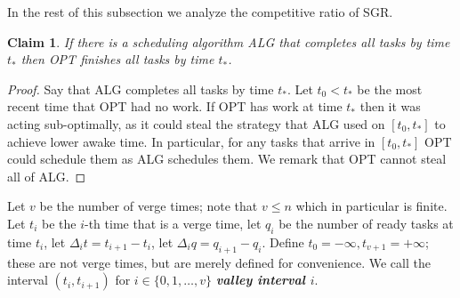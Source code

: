 \documentclass[twocolumn]{article}[10pt]
\newcommand{\defn}[1]{{\textit{\textbf{\boldmath #1}}}\xspace}
\newcommand{\floor}[1]{\left\lfloor #1 \right\rfloor}
\newtheorem{clm}{Claim}
\begin{document}

In the rest of this subsection we analyze the competitive ratio
of SGR.

\begin{clm}
  \label{clm:OPT_finishes_before_you}
  If there is a scheduling algorithm ALG that completes all tasks by
  time $t_*$ then OPT finishes all tasks by time $t_*$.
\end{clm}
\begin{proof}
  Say that ALG completes all tasks by time $t_*$.
  Let $t_0 < t_*$ be the most recent time that OPT had no work.
  If OPT has work at time $t_*$ then it was acting sub-optimally,
  as it could steal the strategy that ALG used on $[t_0, t_*]$ to
  achieve lower awake time. In particular, for any tasks that
  arrive in $[t_0, t_*]$ OPT could schedule them as ALG schedules
  them. We remark that OPT cannot steal all of ALG. 
\end{proof}

Let $v$ be the number of verge times; note that $v\le n$ which
in particular is finite. Let $t_i$ be the $i$-th time that is a
verge time, let $q_i$ be the number of ready tasks at time
$t_i$, let $\Delta_i t = t_{i+1} - t_i$, let $\Delta_i q =
q_{i+1} - q_i$. Define $t_0 = -\infty, t_{v+1} = +\infty$; 
these are not verge times, but are merely defined for convenience.
We call the interval $(t_i, t_{i+1})$ for $i\in \{0,1,\ldots,
v\}$ \defn{valley interval $i$}. 
\end{document}
